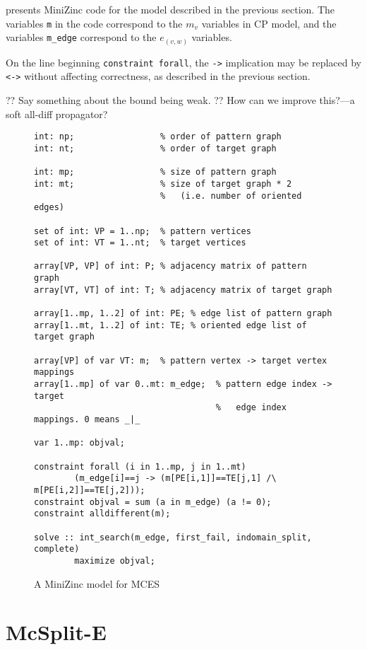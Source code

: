  presents MiniZinc code for the model described in the
previous section.  The variables \texttt{m} in the code correspond to the
$m_v$ variables in CP model, and the variables \texttt{m\_edge} correspond
to the $e_{(v,w)}$ variables.

On the line beginning \texttt{constraint forall}, the \texttt{->} implication
may be replaced by \texttt{<->} without affecting correctness, as described
in the previous section.

?? Say something about the bound being weak.  ?? How can we improve
this?---a soft all-diff propagator?

\begin{figure}[htb]
\vspace{.8em}
\scriptsize
\begin{verbatim}
int: np;                 % order of pattern graph
int: nt;                 % order of target graph

int: mp;                 % size of pattern graph
int: mt;                 % size of target graph * 2
                         %   (i.e. number of oriented edges)

set of int: VP = 1..np;  % pattern vertices
set of int: VT = 1..nt;  % target vertices

array[VP, VP] of int: P; % adjacency matrix of pattern graph
array[VT, VT] of int: T; % adjacency matrix of target graph

array[1..mp, 1..2] of int: PE; % edge list of pattern graph
array[1..mt, 1..2] of int: TE; % oriented edge list of target graph

array[VP] of var VT: m;  % pattern vertex -> target vertex mappings
array[1..mp] of var 0..mt: m_edge;  % pattern edge index -> target
                                    %   edge index mappings. 0 means _|_

var 1..mp: objval;

constraint forall (i in 1..mp, j in 1..mt)
        (m_edge[i]==j -> (m[PE[i,1]]==TE[j,1] /\ m[PE[i,2]]==TE[j,2]));
constraint objval = sum (a in m_edge) (a != 0);
constraint alldifferent(m);

solve :: int_search(m_edge, first_fail, indomain_split, complete)
        maximize objval;
\end{verbatim}
\vspace{-1em}
\caption{A MiniZinc model for MCES}\label{fig:model3}
\end{figure}

\section{McSplit-E}


